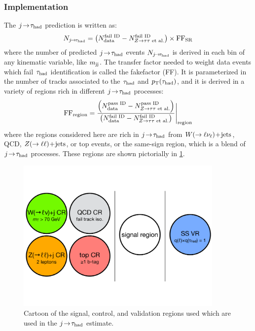 \clearpage

\subsubsection{Implementation}

The $j\!\rightarrow\!\tau_\text{had}$ prediction is written as:
%
\begin{equation}
  \begin{split}
    N_{\fakes} &= \left(N_\text{data}^\text{fail ID} - N_{\contam}^\text{fail ID}\right) \times \FF_\text{SR} \\
  \end{split}
  \label{eqn:fakes-prediction}
\end{equation}
%
where the number of predicted $j\!\rightarrow\!\tau_\text{had}$ events $N_{j\!\rightarrow\!\tau_\text{had}}$ is derived in each bin of any kinematic variable, like $m_{\text{jj}}$. The transfer factor needed to weight data events which fail $\tau_\text{had}$ identification is called the fakefactor (FF). It is parameterized in the number of tracks associated to the $\tau_\text{had}$ and $p_{\mathrm{T}}(\tau_\text{had})$, and it is derived in a variety of regions rich in different $j\!\rightarrow\!\tau_\text{had}$ processes:
%
\begin{equation}
  \begin{split}
    \FF_\text{region} &= \frac{\left(N_\text{data}^\text{pass ID} - N_{\contam}^\text{pass ID}\right)}{\left(N_\text{data}^\text{fail ID} - N_{\contam}^\text{fail ID}\right)} \Bigg\rvert_\text{region} \\
  \end{split}
  \label{eqn:fakes-fakefactor}
\end{equation}
%
where the regions considered here are rich in $j\!\rightarrow\!\tau_\text{had}$ from $W (\rightarrow \ell\nu_\ell)\!+\!\text{jets}$, QCD, $Z (\rightarrow \ell\ell)\!+\!\text{jets}$, or top events, or the same-sign region, which is a blend of $j\!\rightarrow\!\tau_\text{had}$ processes. These regions are shown pictorially in \cref{fig:backgrounds-regions}.

\begin{figure}[tp]
  \centering
  \includegraphics[width=0.90\textwidth]{figures/backgrounds/regions-cartoon}
  \caption{Cartoon of the signal, control, and validation regions used which are used in the $j\!\rightarrow\!\tau_\text{had}$ estimate.}
  \label{fig:backgrounds-regions}
\end{figure}

